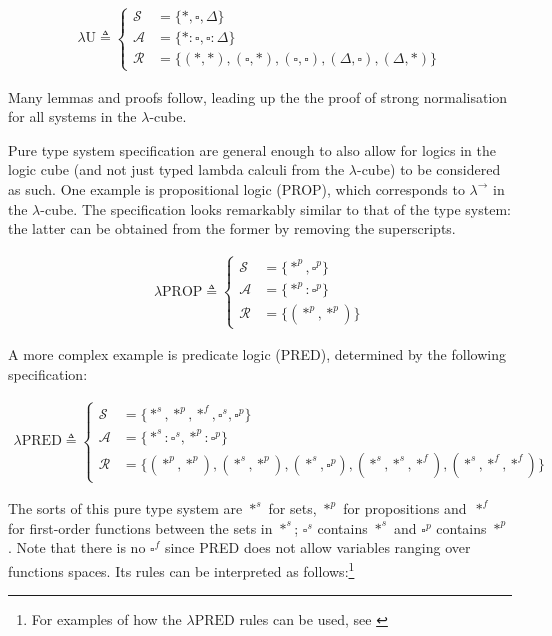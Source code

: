 \documentclass[12pt,toc=bibliography,numbers=noendperiod,
               footnotes=multiple,twoside]{scrartcl}
\begin{document}
\begin{align*}
\lambda\textrm{U} \triangleq
    \begin{cases}
        \mathcal{S} &= \{*,\square,\Delta\} \\
        \mathcal{A} &= \{*:\square,\square:\Delta\} \\
        \mathcal{R} &= \{(*,*),(\square,*),(\square,\square),(\Delta,\square),(\Delta,*)\}
    \end{cases}
\end{align*}

Many lemmas and proofs follow, leading up the the proof of strong normalisation for all systems in the \(\lambda\)-cube.

Pure type system specification are general enough to also allow for logics in the logic cube (and not just typed lambda calculi from the \(\lambda\)-cube) to be considered as such. One example is propositional logic (PROP), which corresponds to \(\lambda^{\rightarrow}\) in the \(\lambda\)-cube. The specification looks remarkably similar to that of the type system: the latter can be obtained from the former by removing the superscripts.

\begin{align*}
\lambda\textrm{PROP} \triangleq
    \begin{cases}
        \mathcal{S} &= \{*^p,\square^p\} \\
        \mathcal{A} &= \{*^p:\square^p\} \\
        \mathcal{R} &= \{(*^p,*^p)\}
    \end{cases}
\end{align*}

A more complex example is predicate logic (PRED), determined by the following specification:

\begin{align*}
\lambda\textrm{PRED} \triangleq
    \begin{cases}
        \mathcal{S} &= \{*^s,*^p,*^f,\square^s,\square^p\} \\
        \mathcal{A} &= \{*^s:\square^s,*^p:\square^p\} \\
        \mathcal{R} &= \{(*^p,*^p),(*^s,*^p),(*^s,\square^p),(*^s,*^s,*^f),(*^s,*^f,*^f)\}
    \end{cases}
\end{align*}

The sorts of this pure type system are \(*^s\) for sets, \(*^p\) for propositions and~\(*^f\) for first-order functions between the sets in \(*^s\); \(\square^s\) contains \(*^s\) and \(\square^p\) contains \(*^p\). Note that there is no \(\square^f\) since PRED does not allow variables ranging over functions spaces. Its rules can be interpreted as follows:\footnote{For examples of how the \(\lambda\textrm{PRED}\) rules can be used, see \textcite[255]{barendregt_lambda_1992}}
\end{document}
